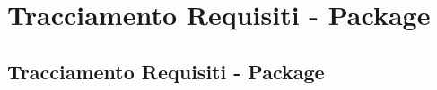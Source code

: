 \section{Tracciamento Requisiti - Package}
\subsection{Tracciamento Requisiti - Package}
\normalsize
%
%

\newpage